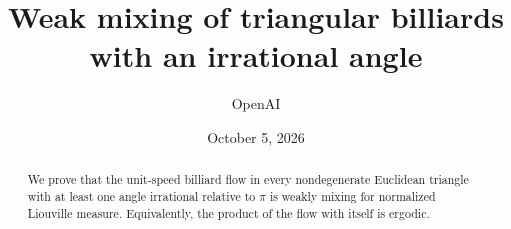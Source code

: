 \documentclass[11pt]{article}
\title{Weak mixing of triangular billiards\\with an irrational angle}
\author{OpenAI}
\date{October 5, 2026}
\theoremstyle{remark}
\begin{document}
\maketitle
\begin{abstract}
We prove that the unit-speed billiard flow in every nondegenerate Euclidean
triangle with at least one angle irrational relative to \(\pi\) is weakly
mixing for normalized Liouville measure. Equivalently, the product of the
flow with itself is ergodic.
\end{abstract}







\end{document}
